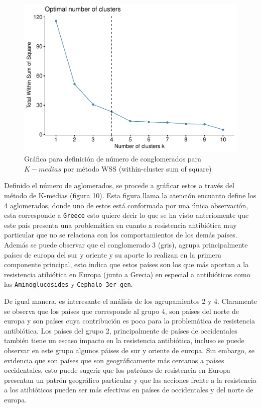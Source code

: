 \documentclass[
]{article}
\begin{document}
\begin{figure}
\centering
\includegraphics{4_actividad_cluster_files/figure-latex/definiendo conglomerados por wss-1.pdf}
\caption{Gráfica para definición de número de conglomerados para
\(K-medias\) por método WSS (within-cluster sum of square)}
\end{figure}

Definido el número de aglomerados, se procede a gráficar estos a través
del método de K-medias (figura 10). Esta figura llama la atención
encuanto define los 4 aglomerados, donde uno de estos está conformada
por una única observación, esta corresponde a \texttt{Greece} esto
quiere decir lo que se ha visto anteriomente que este país presenta una
problemática en cuanto a resistencia antibiótica muy particular que no
se relaciona con los comportamientos de los demás países. Además se
puede observar que el conglomerado 3 (gris), agrupa principalmente
países de europa del sur y oriente y su aporte lo realizan en la primera
componente principal, esto indica que estos países son los que más
aportan a la resistencia atibiótica en Europa (junto a Grecia) en
especial a antibióticos como las \texttt{Aminoglucosides} y
\texttt{Cephalo\_3er\_gen}.

De igual manera, es interesante el análisis de los agrupamientos 2 y 4.
Claramente se observa que los países que corresponde al grupo 4, son
países del norte de europa y son países cuya contribución es poca para
la problemática de resistencia antibiótica. Los países del grupo 2,
principalmente de países de occidentales también tiene un escaso impacto
en la resistencia antibiótica, incluso se puede observar en este grupo
algunos páises de sur y oriente de europa. Sin embargo, se evidencia que
son países que son geográficamente más cercanos a países occidentales,
esto puede sugerir que los patrónes de resistencia en Europa presentan
un patrón geográfico partícular y que las acciones frente a la
resistencia a los atibióticos pueden ser más efectivas en países de
occidentales y del norte de europa.
\end{document}
